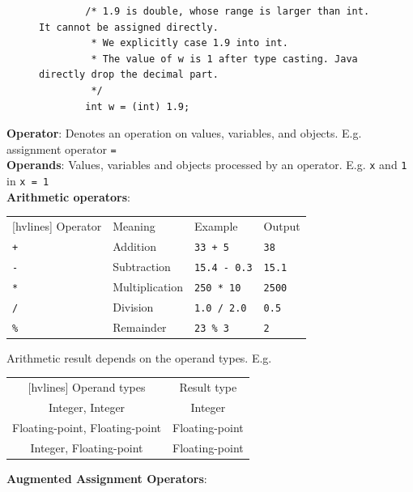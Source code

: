 \documentclass{article}
\begin{document}
\begin{figure}[h]
	\centering
	\begin{verbatim}
		/* 1.9 is double, whose range is larger than int. It cannot be assigned directly.
		 * We explicitly case 1.9 into int.
		 * The value of w is 1 after type casting. Java directly drop the decimal part.
		 */
		int w = (int) 1.9;
	\end{verbatim}
\end{figure}

\textbf{Operator}: Denotes an operation on values, variables, and objects. E.g. assignment operator \texttt{=}\\
\textbf{Operands}: Values, variables and objects processed by an operator. E.g. \texttt{x} and \texttt{1} in \texttt{x = 1}\\
\textbf{Arithmetic operators}:

\begin{table}[h]
	\centering
	\begin{subtable}{.5\textwidth}
		\begin{NiceTabular}{||llll||}[hvlines]
			\RowStyle{\bfseries}Operator & Meaning & Example & Output\\
			\texttt{+} & Addition & \texttt{33 + 5} & \texttt{38}\\
			\texttt{-} & Subtraction & \texttt{15.4 - 0.3} & \texttt{15.1}\\
			\texttt{*} & Multiplication & \texttt{250 * 10} & \texttt{2500}\\
			\texttt{/} & Division & \texttt{1.0 / 2.0} & \texttt{0.5}\\
			\texttt{\%} & Remainder & \texttt{23 \% 3} & \texttt{2}
		\end{NiceTabular}
	\end{subtable}
	\begin{subtable}{.45\textwidth}
		Arithmetic result depends on the operand types. E.g.\\
		\begin{NiceTabular}{||cc||}[hvlines]
			\RowStyle{\bfseries}Operand types & Result type\\
			Integer, Integer & Integer\\
			Floating-point, Floating-point & Floating-point\\
			Integer, Floating-point & Floating-point
		\end{NiceTabular}
	\end{subtable}
\end{table}

\textbf{Augmented Assignment Operators}:
\end{document}
